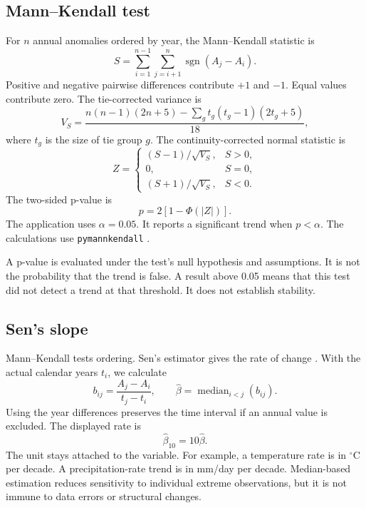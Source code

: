 \documentclass[10pt,a4paper,twocolumn]{article}
\newcommand{\code}[1]{\texttt{#1}}
\begin{document}
\subsection{Mann--Kendall test}
For $n$ annual anomalies ordered by year, the Mann--Kendall statistic is
\begin{equation}
S=\sum_{i=1}^{n-1}\sum_{j=i+1}^{n}\operatorname{sgn}(A_j-A_i).
\end{equation}
Positive and negative pairwise differences contribute $+1$ and $-1$. Equal values contribute zero. The tie-corrected variance is
\begin{equation}
V_S=\frac{n(n-1)(2n+5)-\sum_g t_g(t_g-1)(2t_g+5)}{18},
\end{equation}
where $t_g$ is the size of tie group $g$. The continuity-corrected normal statistic is
\begin{equation}
Z=\begin{cases}
(S-1)/\sqrt{V_S}, & S>0,\\
0, & S=0,\\
(S+1)/\sqrt{V_S}, & S<0.
\end{cases}
\end{equation}
The two-sided p-value is
\begin{equation}
p=2\left[1-\Phi(|Z|)\right].
\end{equation}
The application uses $\alpha=0.05$. It reports a significant trend when $p<\alpha$. The calculations use \code{pymannkendall} \cite{mann,pymk}.

A p-value is evaluated under the test's null hypothesis and assumptions. It is not the probability that the trend is false. A result above 0.05 means that this test did not detect a trend at that threshold. It does not establish stability.

\subsection{Sen's slope}
Mann--Kendall tests ordering. Sen's estimator gives the rate of change \cite{sen}. With the actual calendar years $t_i$, we calculate
\begin{equation}
b_{ij}=\frac{A_j-A_i}{t_j-t_i},
\qquad \hat\beta=\operatorname{median}_{i<j}(b_{ij}).
\end{equation}
Using the year differences preserves the time interval if an annual value is excluded. The displayed rate is
\begin{equation}
\hat\beta_{10}=10\hat\beta.
\end{equation}
The unit stays attached to the variable. For example, a temperature rate is in $^\circ$C per decade. A precipitation-rate trend is in mm/day per decade. Median-based estimation reduces sensitivity to individual extreme observations, but it is not immune to data errors or structural changes.
\end{document}
